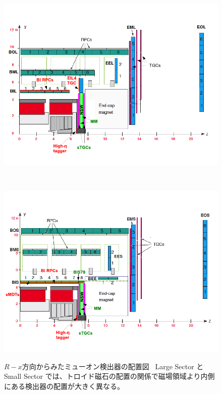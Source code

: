 \begin{figure}[p]
    \vspace{-100pt}
    \begin{minipage}[t]{\hsize}
        \hspace*{1cm}
        \includegraphics[clip, width=12cm]{fig/2/muon_Rz_Large.pdf}
    \end{minipage}\\
    
    \begin{minipage}[b]{\hsize}
        \hspace*{1cm}
        \includegraphics[clip, width=12cm]{fig/2/muon_Rz_small.pdf}
        \label{fig:検出器_エンド}
    \end{minipage}
    \caption{$R-x$方向からみたミューオン検出器の配置図\cite{article:phase2}~ Large Sector と Small Sector では、トロイド磁石の配置の関係で磁場領域より内側にある検出器の配置が大きく異なる。}
    \label{fig:ミューオン検出器_エンド}
\end{figure}

